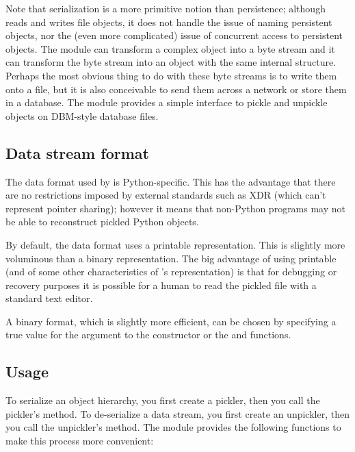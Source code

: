 Note that serialization is a more primitive notion than persistence;
although
 reads and writes file objects, it does not handle the
issue of naming persistent objects, nor the (even more complicated)
issue of concurrent access to persistent objects.  The 
module can transform a complex object into a byte stream and it can
transform the byte stream into an object with the same internal
structure.  Perhaps the most obvious thing to do with these byte
streams is to write them onto a file, but it is also conceivable to
send them across a network or store them in a database.  The module
 provides a simple interface
to pickle and unpickle objects on DBM-style database files.

\subsection{Data stream format}

The data format used by  is Python-specific.  This has
the advantage that there are no restrictions imposed by external
standards such as XDR
(which can't represent pointer sharing); however it means that
non-Python programs may not be able to reconstruct pickled Python
objects.

By default, the  data format uses a printable \ASCII{}
representation.  This is slightly more voluminous than a binary
representation.  The big advantage of using printable \ASCII{} (and of
some other characteristics of 's representation) is that
for debugging or recovery purposes it is possible for a human to read
the pickled file with a standard text editor.

A binary format, which is slightly more efficient, can be chosen by
specifying a true value for the  argument to the
 constructor or the  and 
functions.

\subsection{Usage}

To serialize an object hierarchy, you first create a pickler, then you
call the pickler's  method.  To de-serialize a data
stream, you first create an unpickler, then you call the unpickler's
 method.  The  module provides the
following functions to make this process more convenient:


